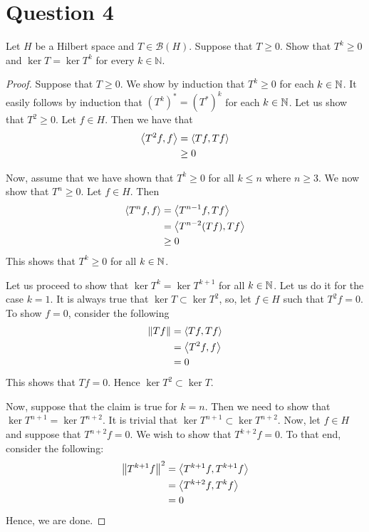 \section{Question 4}
\horz

Let $H$ be a Hilbert space and $T\in \mathcal B(H).$ Suppose that $T \geqslant 0.$ Show that $T^k\geqslant 0$ and  $\ker T = \ker T^k$ for every $k\in \mathbb N.$

\horz

\begin{proof}
    Suppose that $T\ge 0$. We show by induction that $T^{k}\ge 0$ for each $k\in \mathbb N$. It easily follows by induction that $\left( T^{k} \right)^{*} = \left( T^{*} \right)^{k}$ for each $k\in \mathbb N$. Let us show that $T^{2} \ge 0$. Let $f\in H$. Then we have that 
    \begin{align*}
	\left\langle T^{2}f,f \right\rangle &= \left\langle Tf, Tf \right\rangle \\
	&\ge 0
    \end{align*}

    Now, assume that we have shown that $T^{k} \ge 0$ for all $k \le n$ where $n\ge 3$. We now show that $T^{n} \ge 0$. Let $f\in H$. Then
    \begin{align*}
	\left\langle T^{n}f,f \right\rangle &= \left\langle T^{n-1}f, Tf \right\rangle \\
	&= \left\langle T^{n-2}(Tf), Tf \right\rangle  \\
	& \ge 0
    \end{align*}
    This shows that $T^{k} \ge 0$ for all $k \in \mathbb N$.

    Let us proceed to show that $\ker T^{k} = \ker T^{k+1}$ for all $k \in \mathbb N$.  Let us do it for the case $k=1$. It is always true that $\ker T \subset \ker T^{2}$, so, let $f\in H$ such that $T^{2}f = 0$. To show $f= 0$, consider the following
    \begin{align*}
	\left\lVert Tf \right\rVert &= \left\langle Tf, Tf \right\rangle \\
	&= \left\langle T^{2}f, f \right\rangle \\
	&= 0
    \end{align*}
    This shows that $Tf=0$. Hence $\ker T^{2} \subset \ker T$.

    Now, suppose that the claim is true for $k=n$. Then we need to show that $\ker T^{n+1} = \ker T^{n+2}$. It is trivial that $\ker T^{n+1} \subset \ker T^{n+2}$. Now, let $f\in H$ and suppose that $T^{n+2}f = 0$. We wish to show that $T^{k+2}f = 0$. To that end, consider the following:
    \begin{align*}
	\left\lVert T^{k+1}f \right\rVert^{2}&= \left\langle T^{k+1}f, T^{k+1}f \right\rangle \\
	&= \left\langle T^{k+2}f, T^{k}f \right\rangle \\
	&= 0
    \end{align*}
    Hence, we are done.
    \end{proof}
